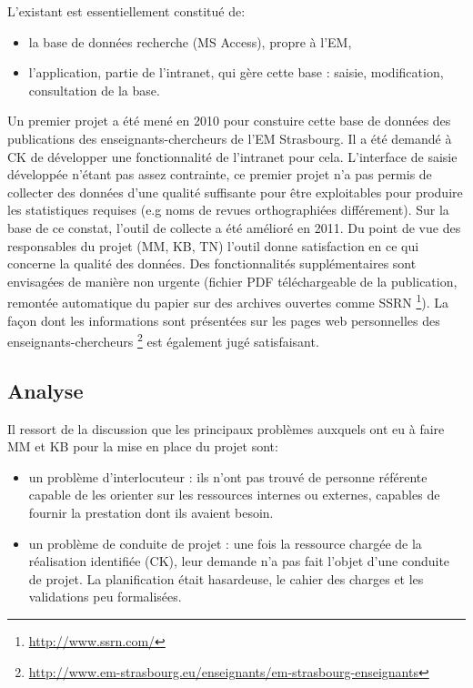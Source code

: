 \documentclass{book}
\begin{document}
L'existant est essentiellement constitué de:
\begin{itemize}
\item la base de données recherche (MS Access), propre à l'EM,
\item l'application, partie de l'intranet, qui gère cette base : saisie, 
modification, consultation de la base.
\end{itemize}
Un premier projet a été mené en 2010 pour constuire cette base de données des
publications des enseignants-chercheurs de l'EM Strasbourg. Il a été demandé à 
CK de développer une fonctionnalité de l'intranet pour cela. L'interface de 
saisie développée n'étant pas assez contrainte, ce premier projet n'a pas 
permis de collecter des données d'une qualité suffisante pour être exploitables
pour produire les statistiques requises (e.g noms de revues orthographiées 
différement). Sur la base de ce constat, l'outil de collecte a été amélioré en 
2011. Du point de vue des responsables du projet (MM, KB, TN) l'outil donne 
satisfaction en ce qui concerne la qualité des données. Des fonctionnalités 
supplémentaires sont envisagées de manière non urgente (fichier PDF téléchargeable 
de la publication, remontée automatique du papier sur des archives ouvertes comme SSRN%
\footnote{\url{ http://www.ssrn.com/}}).
La façon dont les informations sont présentées sur les pages web personnelles
des enseignants-chercheurs%
\footnote{\url{http://www.em-strasbourg.eu/enseignants/em-strasbourg-enseignants}}
est également jugé satisfaisant.


\subsection{Analyse}

Il ressort de la discussion que les principaux problèmes auxquels ont eu à 
faire MM et KB pour la mise en place du projet sont:
\begin{itemize}
\item un problème d'interlocuteur : ils n'ont pas trouvé de personne référente 
capable de les orienter sur les ressources internes ou externes, capables de fournir 
la prestation dont ils avaient besoin.
\item un problème de conduite de projet : une fois la ressource chargée de la 
réalisation identifiée (CK), leur demande n'a pas fait l'objet d'une conduite
de projet. La planification était hasardeuse, le cahier des charges et
les validations peu formalisées.
\end{itemize}
\end{document}
